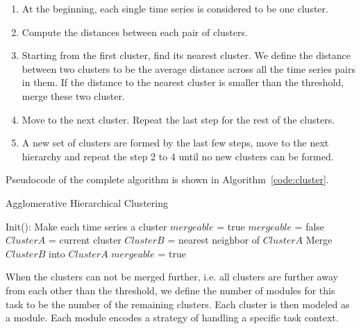 \begin{enumerate}
\item At the beginning, each single time series is considered to be one cluster.
\item Compute the distances between each pair of clusters.
\item Starting from the first cluster, find its nearest cluster. We define the distance between two clusters to be the average distance across all the time series pairs in them. If the distance to the nearest cluster is smaller than the threshold, merge these two cluster.
\item Move to the next cluster. Repeat the last step for the rest of the clusters.
\item A new set of clusters are formed by the last few steps, move to the next hierarchy and repeat the step 2 to 4 until no new clusters can be formed.
\end{enumerate}

Pseudocode of the complete algorithm is shown in Algorithm~\ref{code:cluster}.

\begin{algorithm}
  \caption{Agglomerative Hierarchical Clustering}
  \begin{algorithmic}[1]
    \State Init(): Make each time series a cluster\;
    \State $mergeable$ = true\;
      \State $mergeable$ = false\;
        \State $ClusterA$ = current cluster\;
        \State $ClusterB$ = nearest neighbor of $ClusterA$\;
            \State Merge $ClusterB$ into $ClusterA$\;
            \State $mergeable$ = true\;
        \EndIf
      \EndFor
    \EndWhile
    \EndFunction
  \end{algorithmic}
  \label{code:cluster}
\end{algorithm}

When the clusters can not be merged further, i.e. all clusters are further away from each other than the threshold, we define the number of modules for this task to be the number of the remaining clusters. Each cluster is then modeled as a module. Each module encodes a strategy of handling a specific task context.



